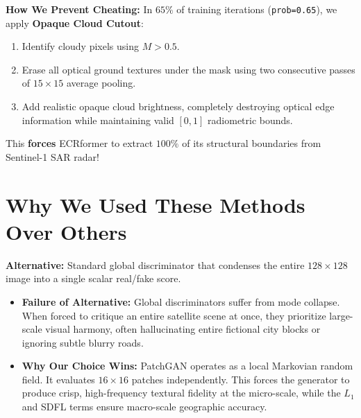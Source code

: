 \documentclass[11pt,a4paper]{article}
\begin{document}
\textbf{How We Prevent Cheating:} In $65\%$ of training iterations (\texttt{prob=0.65}), we apply \textbf{Opaque Cloud Cutout}:
\begin{enumerate}[leftmargin=1.5em, itemsep=0.2em]
    \item Identify cloudy pixels using $M > 0.5$.
    \item Erase all optical ground textures under the mask using two consecutive passes of $15 \times 15$ average pooling.
    \item Add realistic opaque cloud brightness, completely destroying optical edge information while maintaining valid $[0, 1]$ radiometric bounds.
\end{enumerate}
This \textbf{forces} ECRformer to extract $100\%$ of its structural boundaries from Sentinel-1 SAR radar!

\section{Why We Used These Methods Over Others}

\begin{tcolorbox}[colback=white,colframe=primary,title=\textbf{1. Why Conditional PatchGAN over Standard Global GAN (e.g. DCGAN, WGAN)?}]
\textbf{Alternative:} Standard global discriminator that condenses the entire $128 \times 128$ image into a single scalar real/fake score.
\begin{itemize}[leftmargin=1.2em, itemsep=0.2em]
    \item \textbf{Failure of Alternative:} Global discriminators suffer from mode collapse. When forced to critique an entire satellite scene at once, they prioritize large-scale visual harmony, often hallucinating entire fictional city blocks or ignoring subtle blurry roads.
    \item \textbf{Why Our Choice Wins:} PatchGAN operates as a local Markovian random field. It evaluates $16 \times 16$ patches independently. This forces the generator to produce crisp, high-frequency textural fidelity at the micro-scale, while the $L_1$ and SDFL terms ensure macro-scale geographic accuracy.
\end{itemize}
\end{tcolorbox}
\end{document}
